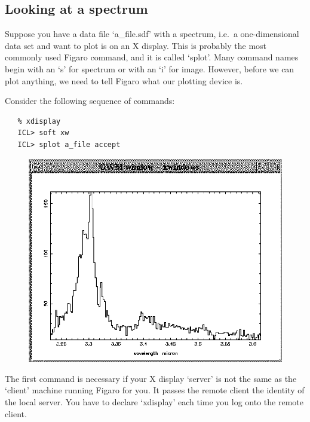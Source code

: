 
\subsection{\label{lookspec}Looking at a spectrum}

   Suppose you have a data file `a\_file.sdf' with a spectrum, i.e.\ a
   one-dimensional data set and want to plot is on an X display. This is
   probably the most commonly used Figaro command, and it is called
   `splot'. Many command names begin with an `s' for spectrum or with
   an `i' for image. However, before we can plot anything, we need to
   tell Figaro what our plotting device is.

   Consider the following sequence of commands:

\begin{verbatim}
   % xdisplay
   ICL> soft xw
   ICL> splot a_file accept
\end{verbatim}

\begin{latexonly}
\begin{figure}[htb]
\begin{center}
\includegraphics{sun86_spec.eps}
\end{center}
\end{figure}
\end{latexonly}

   The first command is necessary if your X display `server' is not
   the same as the `client' machine running Figaro for you. It
   passes the remote client the identity of the local server. You have
   to declare `xdisplay' each time you log onto the remote client.

